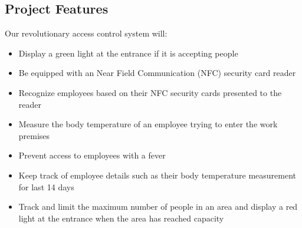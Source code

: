 \subsection{Project Features}

Our revolutionary access control system will:
\begin{itemize}
    \item Display a green light at the entrance if it is accepting people
    \item Be equipped with an Near Field Communication (NFC) security card
          reader
    \item Recognize employees based on their NFC security cards presented to
          the reader 
    \item Measure the body temperature of an employee trying to enter the work
          premises 
    \item Prevent access to employees with a fever
    \item Keep track of employee details such as their body temperature
          measurement for last 14 days
    \item Track and limit the maximum number of people in an area and display a
          red light at the entrance when the area has reached capacity
\end{itemize}

